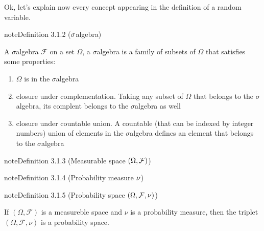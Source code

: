 \documentclass[letterpaper,10pt,english]{jupyterBook}
\begin{document}
\sphinxAtStartPar
Ok, let’s explain now every concept appearing in the definition of a random variable.
\label{ch/prob/rv-def:def:sigma-algebra}
\begin{sphinxadmonition}{note}{Definition 3.1.2 (\protect\(\sigma\protect\)\sphinxhyphen{}algebra)}



\sphinxAtStartPar
A \(\sigma\)\sphinxhyphen{}algebra \(\mathcal{F}\) on a set \(\Omega\), a \(\sigma\)\sphinxhyphen{}algebra is a family of subsets of \(\Omega\) that satisfies some properties:
\begin{enumerate}
%
\item {} 
\sphinxAtStartPar
\(\Omega\) is in the \(\sigma\)\sphinxhyphen{}algebra

\item {} 
\sphinxAtStartPar
closure under complementation. Taking any subset of \(\Omega\) that belongs to the \(\sigma\)\sphinxhyphen{}algebra, its complent belongs to the \(\sigma\)\sphinxhyphen{}algebra as well

\item {} 
\sphinxAtStartPar
closure under countable union. A countable (that can be indexed by integer numbers) union of elements in the \(\sigma\)\sphinxhyphen{}algebra defines an element that belongs to the \(\sigma\)\sphinxhyphen{}algebra

\end{enumerate}
\end{sphinxadmonition}
\label{ch/prob/rv-def:def:measurable-space}
\begin{sphinxadmonition}{note}{Definition 3.1.3 (Measurable space \protect\( (\Omega, \mathcal{F})\protect\))}


\end{sphinxadmonition}
\label{ch/prob/rv-def:def:prob-measure}
\begin{sphinxadmonition}{note}{Definition 3.1.4 (Probability measure \protect\(\nu\protect\))}


\end{sphinxadmonition}
\label{ch/prob/rv-def:def:prob-space}
\begin{sphinxadmonition}{note}{Definition 3.1.5 (Probability space \protect\( (\Omega, \mathcal{F}, \nu)\protect\))}



\sphinxAtStartPar
If \((\Omega, \mathcal{F})\) is a measureble space and \(\nu\) is a probability measure, then the triplet \((\Omega, \mathcal{F}, \nu)\) is a probability space.
\end{sphinxadmonition}
\end{document}
